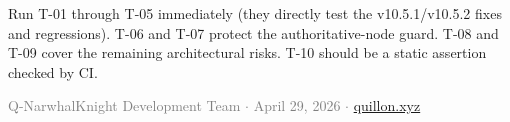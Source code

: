 \documentclass[11pt,a4paper]{article}
\begin{document}
\bigskip

\begin{infobox}
Run T-01 through T-05 immediately (they directly test the v10.5.1/v10.5.2 fixes
and regressions).  T-06 and T-07 protect the authoritative-node guard.  T-08
and T-09 cover the remaining architectural risks.  T-10 should be a static
assertion checked by CI.
\end{infobox}

\bigskip

\begin{center}
{\small\textcolor{gray}{%
Q-NarwhalKnight Development Team $\cdot$ April 29, 2026 $\cdot$
\href{https://quillon.xyz}{quillon.xyz}%
}}
\end{center}
\end{document}
